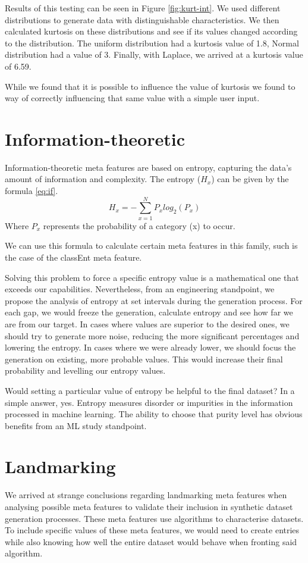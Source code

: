\pagebreak
Results of this testing can be seen in Figure \ref{fig:kurt-int}. We used different distributions to generate data with distinguishable characteristics. We then calculated kurtosis on these distributions and see if its values changed according to the distribution. The uniform distribution had a kurtosis value of 1.8, Normal distribution had a value of 3. Finally, with Laplace, we arrived at a kurtosis value of 6.59.

While we found that it is possible to influence the value of kurtosis we found to way of correctly influencing that same value with a simple user input.
\section{Information-theoretic}
Information-theoretic meta features are based on entropy, capturing the data's amount of information and complexity. 
The entropy ($H_{x}$) can be given by the formula \ref{eq:if}.
\begin{equation}
  \label{eq:if}
  H_{x}=-\sum_{x=1}^{N}P_{x}log_{2}(P_{x})
\end{equation}
Where $P_{x}$ represents the probability of a category (x) to occur.

We can use this formula to calculate certain meta features in this family, such is the case of the classEnt meta feature.

Solving this problem to force a specific entropy value is a mathematical one that exceeds our capabilities. Nevertheless, from an engineering standpoint, we propose the analysis of entropy at set intervals during the generation process. For each gap, we would freeze the generation, calculate entropy and see how far we are from our target. In cases where values are superior to the desired ones, we should try to generate more noise, reducing the more significant percentages and lowering the entropy. In cases where we were already lower, we should focus the generation on existing, more probable values. This would increase their final probability and levelling our entropy values. 

Would setting a particular value of entropy be helpful to the final dataset? In a simple answer, yes. Entropy measures disorder or impurities in the information processed in machine learning. The ability to choose that purity level has obvious benefits from an ML study standpoint.

\section{Landmarking}
We arrived at strange conclusions regarding landmarking meta features when analysing possible meta features to validate their inclusion in synthetic dataset generation processes. These meta features use algorithms to characterise datasets. To include specific values of these meta features, we would need to create entries while also knowing how well the entire dataset would behave when fronting said algorithm.

